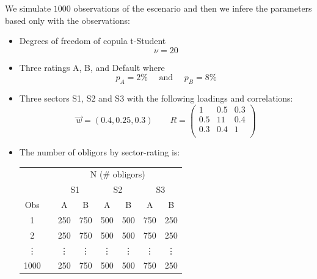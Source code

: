 \documentclass[11pt,fleqn]{book} %
\begin{document}
\begin{example}[1000 observations]
	We simulate $1000$ observations of the escenario and then we infere the
	parameters based only with the observations: 
	\begin{itemize}
		\item Degrees of freedom of copula t-Student
		\begin{displaymath}
			\nu=20
		\end{displaymath}
		\item Three ratings A, B, and Default where
		\begin{displaymath}
			p_A=2\% \quad \text{ and } \quad p_B=8\%
		\end{displaymath}
		\item Three sectors S1, S2 and S3 with the following loadings and correlations:
		\begin{displaymath}
			\vec{w} = (0.4, 0.25, 0.3)
			\qquad 
			R = \left(
			\begin{array}{ccc}
				1 & 0.5 & 0.3 \\
				0.5 & 11 & 0.4 \\
				0.3 & 0.4 & 1 \\
			\end{array}
			\right) 
		\end{displaymath}
		\item The number of obligors by sector-rating is:\\
		\newline
		\begin{tabular}{cc|c|c||c|c||c|c|}
			\cline{3-8}
			& & \multicolumn{6}{|c|}{N (\# obligors)} \\
			\cline{3-8}
			& & \multicolumn{2}{|c||}{S1} & \multicolumn{2}{|c||}{S2} & \multicolumn{2}{|c|}{S3} \\
			\cline{1-1} \cline{3-8}
			\multicolumn{1}{|c|}{Obs} & & A & B & A & B & A & B \\
			\cline{1-1} \cline{3-8}
			\multicolumn{1}{|c|}{1} & & 250 & 750 & 500 & 500 & 750 & 250 \\
			\cline{1-1} \cline{3-8}
			\multicolumn{1}{|c|}{2} & & 250 & 750 & 500 & 500 & 750 & 250 \\
			\cline{1-1} \cline{3-8}
			\multicolumn{1}{|c|}{\vdots} & & \vdots & \vdots & \vdots & \vdots & \vdots & \vdots \\
			\cline{1-1} \cline{3-8}
			\multicolumn{1}{|c|}{1000} & & 250 & 750 & 500 & 500 & 750 & 250 \\
			\cline{1-1} \cline{3-8}
		\end{tabular}

\end{itemize}
\end{example}
\end{document}
